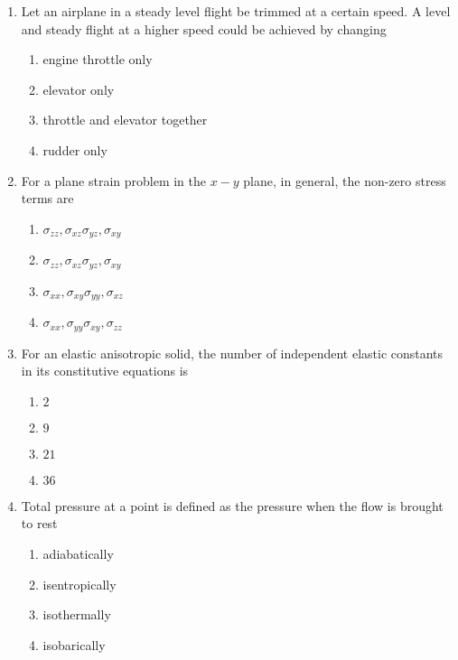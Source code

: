 \documentclass[journal,12pt,twocolumn]{IEEEtran}
\theoremstyle{remark}
\begin{document}
\begin{enumerate}
\item Let an airplane in a steady level flight be trimmed at a certain speed. A level and steady flight at a higher speed could be achieved by changing
\begin{enumerate}
\item engine throttle only
\item elevator only
\item throttle and elevator together
\item rudder only
\end{enumerate}


\item For a plane strain problem in the $x-y$ plane, in general, the non-zero stress terms are
\begin{multicols}{2}
\begin{enumerate}
\item $\sigma_{zz},\sigma_{xz}\sigma_{yz},\sigma_{xy}$
\item $\sigma_{zz},\sigma_{xz}\sigma_{yz},\sigma_{xy}$
\item $\sigma_{xx},\sigma_{xy}\sigma_{yy},\sigma_{xz}$
\item $\sigma_{xx},\sigma_{yy}\sigma_{xy},\sigma_{zz}$
\end{enumerate}
\end{multicols}


\item For an elastic anisotropic solid, the number of independent elastic constants in its constitutive equations is
\begin{multicols}{2}
\begin{enumerate}
\item $2$
\item $9$
\item $21$
\item $36$
\end{enumerate}
\end{multicols}


\item Total pressure at a point is defined as the pressure when the flow is brought to rest
\begin{multicols}{2}
\begin{enumerate}
\item adiabatically
\item isentropically
\item isothermally
\item isobarically
\end{enumerate}
\end{multicols}



\end{enumerate}
\end{document}
